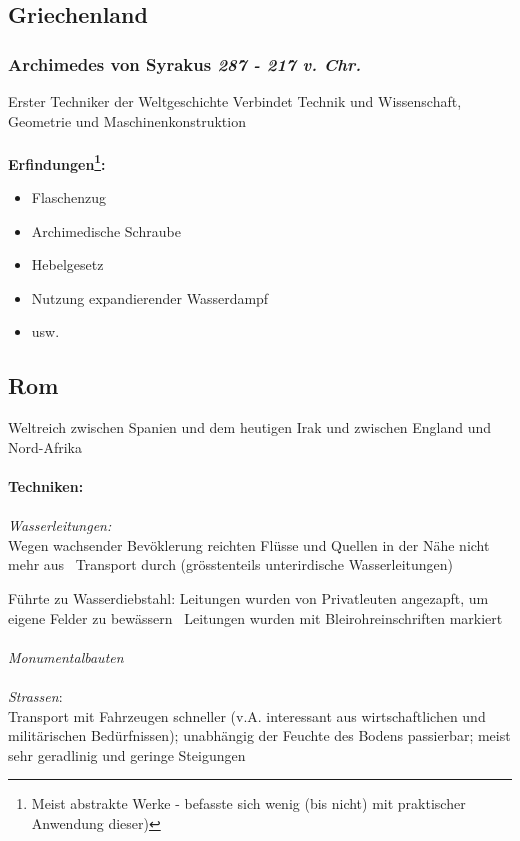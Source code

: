 \documentclass{report}
\begin{document}
\subsection{Griechenland}
\subsubsection{Archimedes von Syrakus \rm{\textit{287 - 217 v. Chr.}}}
Erster Techniker der Weltgeschichte
Verbindet Technik und Wissenschaft, Geometrie und Maschinenkonstruktion\\\\
\textbf{Erfindungen\footnote{Meist abstrakte Werke - befasste sich wenig (bis nicht) mit praktischer Anwendung dieser)}:}
\begin{itemize}
	\item Flaschenzug
	\item Archimedische Schraube
	\item Hebelgesetz
	\item Nutzung expandierender Wasserdampf
	\item usw.
\end{itemize}

\subsection{Rom}
Weltreich zwischen Spanien und dem heutigen Irak und zwischen England und Nord-Afrika\\\\
\textbf{Techniken:}\\\\
\textit{Wasserleitungen:}\\
Wegen wachsender Bevöklerung reichten Flüsse und Quellen in der Nähe nicht mehr aus \arrow~Transport durch (grösstenteils unterirdische Wasserleitungen)\par
Führte zu Wasserdiebstahl: Leitungen wurden von Privatleuten angezapft, um eigene Felder zu bewässern \arrow~Leitungen wurden mit Bleirohreinschriften markiert\\\\
\textit{Monumentalbauten}\\
\\
\textit{Strassen}:\\
Transport mit Fahrzeugen schneller (v.A. interessant aus wirtschaftlichen und militärischen Bedürfnissen); unabhängig der Feuchte des Bodens passierbar; meist sehr geradlinig und geringe Steigungen

\newpage
\end{document}
